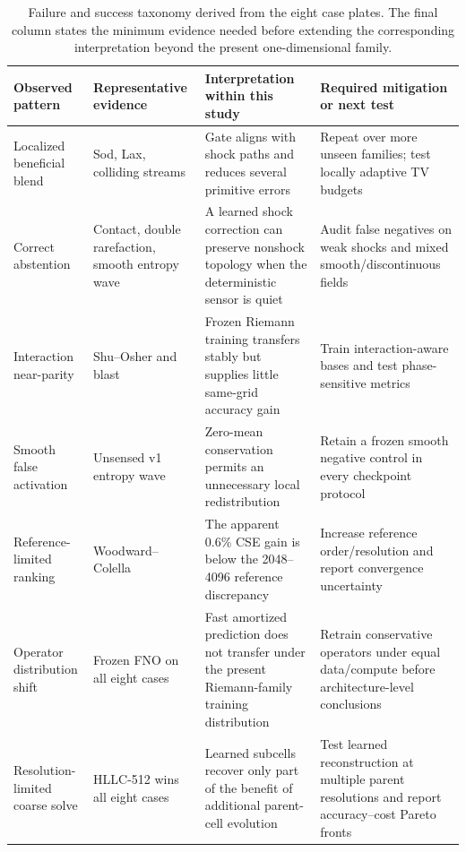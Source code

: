 \documentclass[10pt,twocolumn]{article}
\begin{document}
\begin{table}[t]
\centering
\caption{Failure and success taxonomy derived from the eight case plates. The final column states the minimum evidence needed before extending the corresponding interpretation beyond the present one-dimensional family.}
\label{tab:failuretaxonomy}
\small
\begin{tabularx}{\textwidth}{P{0.18\textwidth}P{0.20\textwidth}P{0.23\textwidth}Y}
\toprule
Observed pattern & Representative evidence & Interpretation within this study & Required mitigation or next test\\
\midrule
Localized beneficial blend & Sod, Lax, colliding streams & Gate aligns with shock paths and reduces several primitive errors & Repeat over more unseen families; test locally adaptive TV budgets\\
Correct abstention & Contact, double rarefaction, smooth entropy wave & A learned shock correction can preserve nonshock topology when the deterministic sensor is quiet & Audit false negatives on weak shocks and mixed smooth/discontinuous fields\\
Interaction near-parity & Shu--Osher and blast & Frozen Riemann training transfers stably but supplies little same-grid accuracy gain & Train interaction-aware bases and test phase-sensitive metrics\\
Smooth false activation & Unsensed v1 entropy wave & Zero-mean conservation permits an unnecessary local redistribution & Retain a frozen smooth negative control in every checkpoint protocol\\
Reference-limited ranking & Woodward--Colella & The apparent 0.6\% CSE gain is below the 2048--4096 reference discrepancy & Increase reference order/resolution and report convergence uncertainty\\
Operator distribution shift & Frozen FNO on all eight cases & Fast amortized prediction does not transfer under the present Riemann-family training distribution & Retrain conservative operators under equal data/compute before architecture-level conclusions\\
Resolution-limited coarse solve & HLLC-512 wins all eight cases & Learned subcells recover only part of the benefit of additional parent-cell evolution & Test learned reconstruction at multiple parent resolutions and report accuracy--cost Pareto fronts\\
\bottomrule
\end{tabularx}
\end{table}
\end{document}
